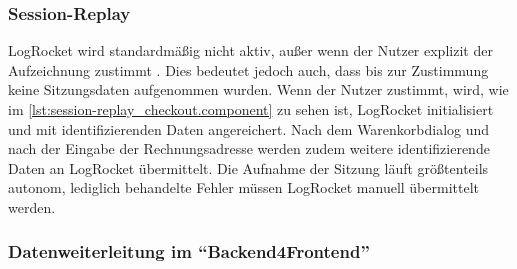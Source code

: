 \subsubsection{Session-Replay}

LogRocket wird standardmäßig nicht aktiv, außer wenn der Nutzer explizit der Aufzeichnung zustimmt \citationneeded{}. Dies bedeutet jedoch auch, dass bis zur Zustimmung keine Sitzungsdaten aufgenommen wurden. Wenn der Nutzer zustimmt, wird, wie im \autoref{lst:session-replay_checkout.component} zu sehen ist, LogRocket initialisiert und mit identifizierenden Daten angereichert. Nach dem Warenkorbdialog und nach der Eingabe der Rechnungsadresse werden zudem weitere identifizierende Daten an LogRocket übermittelt. Die Aufnahme der Sitzung läuft größtenteils autonom, lediglich behandelte Fehler müssen LogRocket manuell übermittelt werden.



\subsubsection{Datenweiterleitung im \enquote{Backend4Frontend}}
